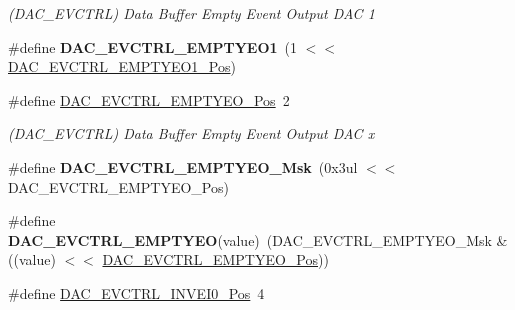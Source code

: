 \begin{DoxyCompactItemize}
\begin{DoxyCompactList}\small\item\em (D\+A\+C\+\_\+\+E\+V\+C\+T\+R\+L) Data Buffer Empty Event Output D\+A\+C 1 \end{DoxyCompactList}\item 
\hypertarget{group___s_a_m_l21___d_a_c_ga0c38faed44b669dc00d031c58fd1d615}{}\#define {\bfseries D\+A\+C\+\_\+\+E\+V\+C\+T\+R\+L\+\_\+\+E\+M\+P\+T\+Y\+E\+O1}~(1 $<$$<$ \hyperlink{group___s_a_m_l21___d_a_c_gaa44f1da02c684b654a656fc7efc9dc62}{D\+A\+C\+\_\+\+E\+V\+C\+T\+R\+L\+\_\+\+E\+M\+P\+T\+Y\+E\+O1\+\_\+\+Pos})\label{group___s_a_m_l21___d_a_c_ga0c38faed44b669dc00d031c58fd1d615}

\item 
\hypertarget{group___s_a_m_l21___d_a_c_ga97e13ff75733b38e502c88e75cba9f3d}{}\#define \hyperlink{group___s_a_m_l21___d_a_c_ga97e13ff75733b38e502c88e75cba9f3d}{D\+A\+C\+\_\+\+E\+V\+C\+T\+R\+L\+\_\+\+E\+M\+P\+T\+Y\+E\+O\+\_\+\+Pos}~2\label{group___s_a_m_l21___d_a_c_ga97e13ff75733b38e502c88e75cba9f3d}

\begin{DoxyCompactList}\small\item\em (D\+A\+C\+\_\+\+E\+V\+C\+T\+R\+L) Data Buffer Empty Event Output D\+A\+C x \end{DoxyCompactList}\item 
\hypertarget{group___s_a_m_l21___d_a_c_gacc0ac331b3cac4dc6736f568990cf5fa}{}\#define {\bfseries D\+A\+C\+\_\+\+E\+V\+C\+T\+R\+L\+\_\+\+E\+M\+P\+T\+Y\+E\+O\+\_\+\+Msk}~(0x3ul $<$$<$ D\+A\+C\+\_\+\+E\+V\+C\+T\+R\+L\+\_\+\+E\+M\+P\+T\+Y\+E\+O\+\_\+\+Pos)\label{group___s_a_m_l21___d_a_c_gacc0ac331b3cac4dc6736f568990cf5fa}

\item 
\hypertarget{group___s_a_m_l21___d_a_c_ga391bc00af4bc72d2e6632cced2369864}{}\#define {\bfseries D\+A\+C\+\_\+\+E\+V\+C\+T\+R\+L\+\_\+\+E\+M\+P\+T\+Y\+E\+O}(value)~(D\+A\+C\+\_\+\+E\+V\+C\+T\+R\+L\+\_\+\+E\+M\+P\+T\+Y\+E\+O\+\_\+\+Msk \& ((value) $<$$<$ \hyperlink{group___s_a_m_l21___d_a_c_ga97e13ff75733b38e502c88e75cba9f3d}{D\+A\+C\+\_\+\+E\+V\+C\+T\+R\+L\+\_\+\+E\+M\+P\+T\+Y\+E\+O\+\_\+\+Pos}))\label{group___s_a_m_l21___d_a_c_ga391bc00af4bc72d2e6632cced2369864}

\item 
\hypertarget{group___s_a_m_l21___d_a_c_gaedf1c4a8e40d019a88fe9e5dd7090e48}{}\#define \hyperlink{group___s_a_m_l21___d_a_c_gaedf1c4a8e40d019a88fe9e5dd7090e48}{D\+A\+C\+\_\+\+E\+V\+C\+T\+R\+L\+\_\+\+I\+N\+V\+E\+I0\+\_\+\+Pos}~4\label{group___s_a_m_l21___d_a_c_gaedf1c4a8e40d019a88fe9e5dd7090e48}


\end{DoxyCompactItemize}
